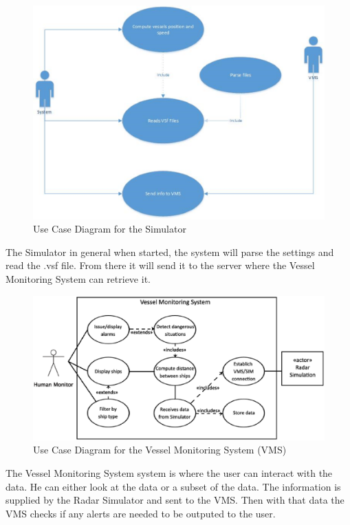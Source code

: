 \documentclass{article}
\begin{document}
\begin{figure}[!htb]
\caption{Use Case Diagram for the Simulator}
\centering
\includegraphics[scale=0.4]{diagrams/usecasediagram.eps}
\end{figure}
The Simulator in general when started, the system will parse the settings and read the .vsf file. From there it will send it to the server where the Vessel Monitoring System can retrieve it.

\break

\begin{figure}[!htb]
\caption{Use Case Diagram for the Vessel Monitoring System (VMS)}
\centering
\includegraphics[scale=0.32]{diagrams/vmsdiagram.eps}
\end{figure}
The Vessel Monitoring System system is where the user can interact with the data. He can either look at the data or a subset of the data. 
The information is supplied by the Radar Simulator and sent to the VMS.
Then with that data the VMS checks if any alerts are needed to be outputed to the user.
\end{document}
